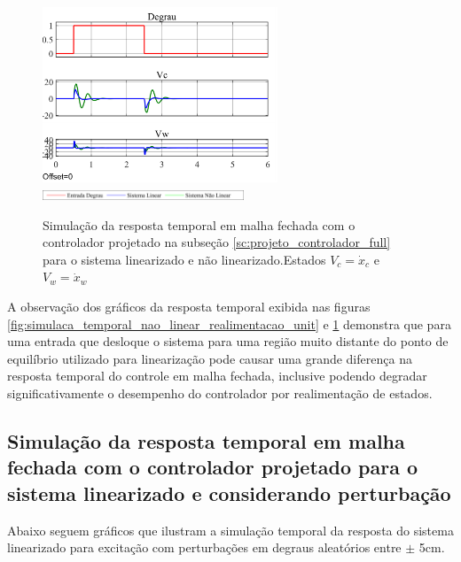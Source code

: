 \documentclass[a4paper]{ifacconf}
\begin{document}
	\FloatBarrier
    \begin{figure}[htbp]
        \begin{centering}
            \includegraphics[width=7cm]{img/simulaca_temporal_nao_linear_realimentacao_unit_V.png}
            \includegraphics[width=6cm]{img/sim_nao_linear_simulink_temp_leg.png}
            \caption{Simulação da resposta temporal em malha fechada com o controlador projetado na subseção \ref{sc:projeto_controlador_full} para o sistema linearizado e não linearizado.Estados $V_c = \dot{x}_c$ e $V_w = \dot{x}_w$ }
            \label{fig:simulaca_temporal_nao_linear_realimentacao_unit_V}
        \end{centering}
    \end{figure}
    \FloatBarrier
    
    A observação dos gráficos da resposta temporal exibida nas figuras \ref{fig:simulaca_temporal_nao_linear_realimentacao_unit} e \ref{fig:simulaca_temporal_nao_linear_realimentacao_unit_V} demonstra que para uma entrada que desloque o sistema para uma região muito distante do ponto de equilíbrio utilizado para linearização pode causar uma grande diferença na resposta temporal do controle em malha fechada, inclusive podendo degradar significativamente o desempenho do controlador por realimentação de estados.  
        \subsection{Simulação da resposta temporal em malha fechada com o controlador projetado para o sistema linearizado e considerando perturbação}
 
    Abaixo seguem gráficos que ilustram a simulação temporal da resposta do sistema linearizado para excitação com perturbações em degraus aleatórios entre $\pm$ 5cm.
\end{document}
